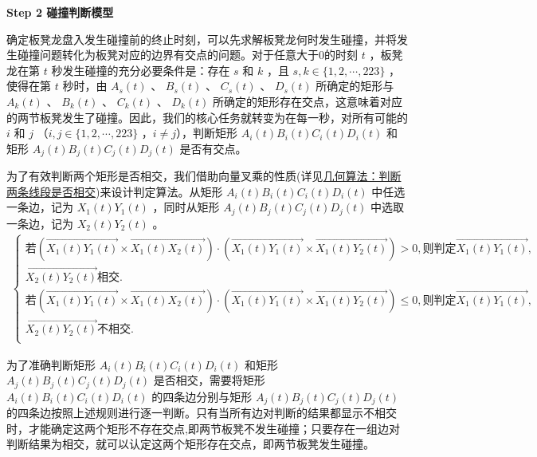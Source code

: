 \documentclass[../main.tex]{subfiles}
\begin{document}
     \noindent\textbf{Step 2 碰撞判断模型}
 \par 确定板凳龙盘入发生碰撞前的终止时刻，可以先求解板凳龙何时发生碰撞，并将发生碰撞问题转化为板凳对应的边界有交点的问题。对于任意大于0的时刻 \(t\) ，板凳龙在第 \(t\) 秒发生碰撞的充分必要条件是：存在 \(s\) 和 \(k\) ，且 \(s, k \in \{1, 2, \cdots, 223\}\) ，使得在第 \(t\) 秒时，由 \(A_s(t)\) 、 \(B_s(t)\) 、 \(C_s(t)\) 、 \(D_s(t)\) 所确定的矩形与 \(A_k(t)\) 、 \(B_k(t)\) 、 \(C_k(t)\) 、 \(D_k(t)\) 所确定的矩形存在交点，这意味着对应的两节板凳发生了碰撞。因此，我们的核心任务就转变为在每一秒，对所有可能的 \(i\) 和 \(j\) （\(i, j \in \{1, 2, \cdots, 223\}\) ，$i\ne j$），判断矩形 \(A_i(t)B_i(t)C_i(t)D_i(t)\) 和矩形 \(A_j(t)B_j(t)C_j(t)D_j(t)\) 是否有交点。
 \par 为了有效判断两个矩形是否相交，我们借助向量叉乘的性质(详见\href{https://zhuanlan.zhihu.com/p/644689588}{几何算法：判断两条线段是否相交})来设计判定算法。从矩形 \(A_i(t)B_i(t)C_i(t)D_i(t)\) 中任选一条边，记为 \(X_1(t)Y_1(t)\) ，同时从矩形 \(A_j(t)B_j(t)C_j(t)D_j(t)\) 中选取一条边，记为 \(X_2(t)Y_2(t)\) 。
 \begin{align}\label{1.........32}
     \begin{cases}
     \text{若}\left( \overrightarrow{X_1\left( t \right) Y_1\left( t \right) }\times \overrightarrow{X_1\left( t \right) X_2\left( t \right) } \right) \cdot \left( \overrightarrow{X_1\left( t \right) Y_1\left( t \right) }\times \overrightarrow{X_1\left( t \right) Y_2\left( t \right) } \right) >0,\text{则判定}\overrightarrow{X_1\left( t \right) Y_1\left( t \right) },
     \\\overrightarrow{X_2\left( t \right) Y_2\left( t \right) }\text{相交}.\\
     \text{若}\left( \overrightarrow{X_1\left( t \right) Y_1\left( t \right) }\times \overrightarrow{X_1\left( t \right) X_2\left( t \right) } \right) \cdot \left( \overrightarrow{X_1\left( t \right) Y_1\left( t \right) }\times \overrightarrow{X_1\left( t \right) Y_2\left( t \right) } \right) \leqslant 0,\text{则判定}\overrightarrow{X_1\left( t \right) Y_1\left( t \right) },
     \\\overrightarrow{X_2\left( t \right) Y_2\left( t \right) }\text{不相交}.\\
     \end{cases}
     \end{align}
     \par 为了准确判断矩形 \(A_i(t)B_i(t)C_i(t)D_i(t)\) 和矩形 \(A_j(t)B_j(t)C_j(t)D_j(t)\) 是否相交，需要将矩形 \(A_i(t)B_i(t)C_i(t)D_i(t)\) 的四条边分别与矩形 \(A_j(t)B_j(t)C_j(t)D_j(t)\) 的四条边按照上述规则进行逐一判断。只有当所有边对判断的结果都显示不相交时，才能确定这两个矩形不存在交点,即两节板凳不发生碰撞；只要存在一组边对判断结果为相交，就可以认定这两个矩形存在交点，即两节板凳发生碰撞。
\end{document}
